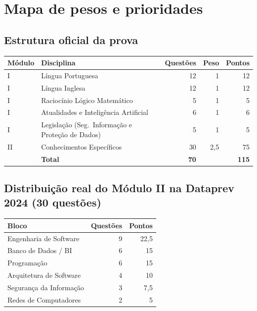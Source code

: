 \chapter{Mapa de pesos e prioridades}

\section{Estrutura oficial da prova}

\begin{center}
\begin{tabular}{@{}p{2.2cm}p{5.2cm}rrr@{}}
\toprule
\textbf{Módulo} & \textbf{Disciplina} & \textbf{Questões} & \textbf{Peso} & \textbf{Pontos} \\
\midrule
I & Língua Portuguesa & 12 & 1 & 12 \\
I & Língua Inglesa & 12 & 1 & 12 \\
I & Raciocínio Lógico Matemático & 5 & 1 & 5 \\
I & Atualidades e Inteligência Artificial & 6 & 1 & 6 \\
I & Legislação (Seg.\ Informação e Proteção de Dados) & 5 & 1 & 5 \\
II & Conhecimentos Específicos & 30 & 2,5 & 75 \\
\midrule
& \textbf{Total} & \textbf{70} & & \textbf{115} \\
\bottomrule
\end{tabular}
\end{center}

\section{Distribuição real do Módulo II na Dataprev 2024 (30 questões)}

\begin{center}
\begin{tabular}{@{}p{6.4cm}rr@{}}
\toprule
\textbf{Bloco} & \textbf{Questões} & \textbf{Pontos} \\
\midrule
Engenharia de Software & 9 & 22,5 \\
Banco de Dados / BI & 6 & 15 \\
Programação & 6 & 15 \\
Arquitetura de Software & 4 & 10 \\
Segurança da Informação & 3 & 7,5 \\
Redes de Computadores & 2 & 5 \\
\bottomrule
\end{tabular}
\end{center}

